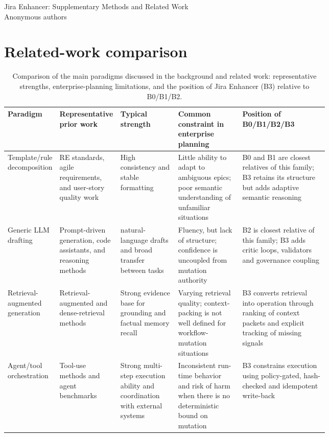 \documentclass[10pt,a4paper]{article}
\begin{document}
\begin{landscape}
\begin{center}
\Large Jira Enhancer: Supplementary Methods and Related Work\\[0.4em]
\normalsize Anonymous authors
\end{center}
\section{Related-work comparison}
\begin{table}[H]
\centering
\setlength{\tabcolsep}{4pt}
\small
\caption{Comparison of the main paradigms discussed in the background and related work: representative strengths, enterprise-planning limitations, and the position of Jira Enhancer (B3) relative to B0/B1/B2.}
\label{tab:related-work-comparative}
\begin{tabularx}{\linewidth}{@{}>{\raggedright\arraybackslash}p{0.16\linewidth}>{\raggedright\arraybackslash}p{0.19\linewidth}>{\raggedright\arraybackslash}p{0.18\linewidth}>{\raggedright\arraybackslash}p{0.20\linewidth}>{\raggedright\arraybackslash}X@{}}
\toprule
Paradigm & Representative prior work & Typical strength & Common constraint in enterprise planning & Position of B0/B1/B2/B3 \\
\midrule
Template/rule decomposition & RE standards, agile requirements, and user-story quality work \citep{R52,R62,R63} & High consistency and stable formatting & Little ability to adapt to ambiguous epics; poor semantic understanding of unfamiliar situations & B0 and B1 are closest relatives of this family; B3 retains its structure but adds adaptive semantic reasoning \\
Generic LLM drafting & Prompt-driven generation, code assistants, and reasoning methods \citep{R1,R14,R59,R77} & natural-language drafts and broad transfer between tasks & Fluency, but lack of structure; confidence is uncoupled from mutation authority & B2 is closest relative of this family; B3 adds critic loops, validators and governance coupling \\
Retrieval-augmented generation & Retrieval-augmented and dense-retrieval methods \citep{R3,R5,R22} & Strong evidence base for grounding and factual memory recall & Varying retrieval quality; context-packing is not well defined for workflow-mutation situations & B3 converts retrieval into operation through ranking of context packets and explicit tracking of missing signals \\
Agent/tool orchestration & Tool-use methods and agent benchmarks \citep{R17,R27,R28,R92} & Strong multi-step execution ability and coordination with external systems & Inconsistent run-time behavior and risk of harm \citep{R87} when there is no deterministic bound on mutation & B3 constrains execution using policy-gated, hash-checked and idempotent write-back \\

\end{tabularx}
\end{table}
\end{landscape}
\end{document}

